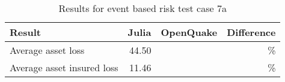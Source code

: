 \begin{table}[htbp]

\centering
\begin{tabular}{ l r r r }

\hline
\rowcolor{anti-flashwhite}
\bf{Result} & \bf{Julia} & \bf{OpenQuake} & \bf{Difference}\\
\hline
Average asset loss & 44.50 &  & \% \\
Average asset insured loss & 11.46 &  & \% \\
\hline
\end{tabular}

\caption{Results for event based risk test case 7a}
\label{tab:result-ebr-7a}
\end{table}